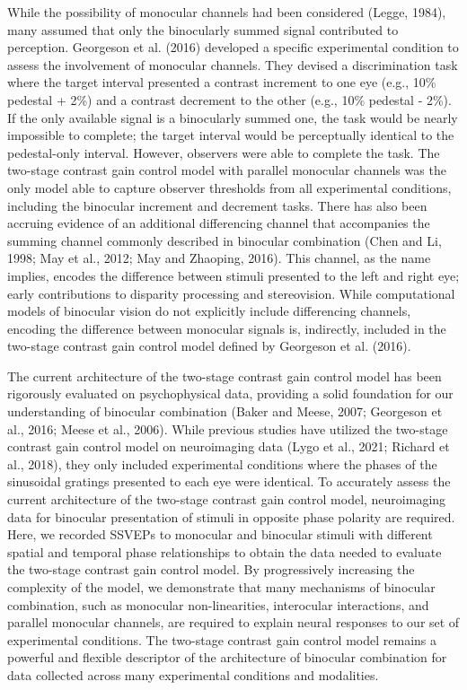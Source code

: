 \documentclass[
  12pt,
]{article}
\begin{document}
While the possibility of monocular channels had been considered (Legge,
1984), many assumed that only the binocularly summed signal contributed
to perception. Georgeson et al. (2016) developed a specific experimental
condition to assess the involvement of monocular channels. They devised
a discrimination task where the target interval presented a contrast
increment to one eye (e.g., 10\% pedestal + 2\%) and a contrast
decrement to the other (e.g., 10\% pedestal - 2\%). If the only
available signal is a binocularly summed one, the task would be nearly
impossible to complete; the target interval would be perceptually
identical to the pedestal-only interval. However, observers were able to
complete the task. The two-stage contrast gain control model with
parallel monocular channels was the only model able to capture observer
thresholds from all experimental conditions, including the binocular
increment and decrement tasks. There has also been accruing evidence of
an additional differencing channel that accompanies the summing channel
commonly described in binocular combination (Chen and Li, 1998; May et
al., 2012; May and Zhaoping, 2016). This channel, as the name implies,
encodes the difference between stimuli presented to the left and right
eye; early contributions to disparity processing and stereovision. While
computational models of binocular vision do not explicitly include
differencing channels, encoding the difference between monocular signals
is, indirectly, included in the two-stage contrast gain control model
defined by Georgeson et al. (2016).

The current architecture of the two-stage contrast gain control model
has been rigorously evaluated on psychophysical data, providing a solid
foundation for our understanding of binocular combination (Baker and
Meese, 2007; Georgeson et al., 2016; Meese et al., 2006). While previous
studies have utilized the two-stage contrast gain control model on
neuroimaging data (Lygo et al., 2021; Richard et al., 2018), they only
included experimental conditions where the phases of the sinusoidal
gratings presented to each eye were identical. To accurately assess the
current architecture of the two-stage contrast gain control model,
neuroimaging data for binocular presentation of stimuli in opposite
phase polarity are required. Here, we recorded SSVEPs to monocular and
binocular stimuli with different spatial and temporal phase
relationships to obtain the data needed to evaluate the two-stage
contrast gain control model. By progressively increasing the complexity
of the model, we demonstrate that many mechanisms of binocular
combination, such as monocular non-linearities, interocular
interactions, and parallel monocular channels, are required to explain
neural responses to our set of experimental conditions. The two-stage
contrast gain control model remains a powerful and flexible descriptor
of the architecture of binocular combination for data collected across
many experimental conditions and modalities.
\end{document}

